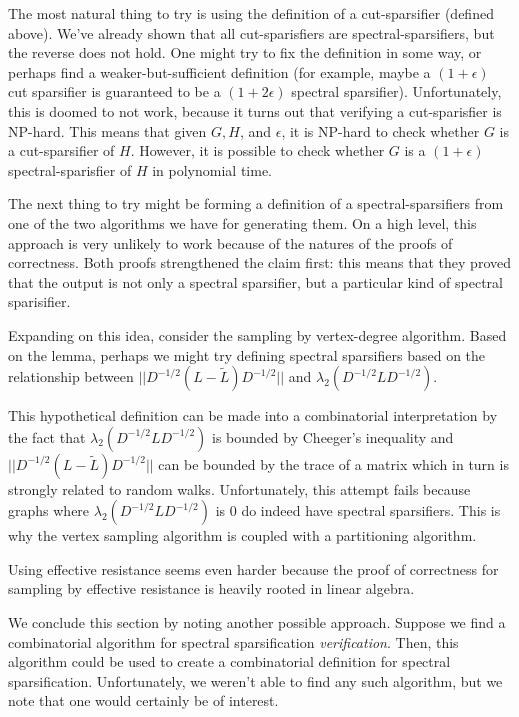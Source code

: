 \documentclass[12pt,twoside]{article}
\begin{document}
The most natural thing to try is using the definition of a cut-sparsifier (defined above). We've already shown that all cut-sparisfiers are spectral-sparsifiers, but the reverse does not hold. One might try to fix the definition in some way, or perhaps find a weaker-but-sufficient definition (for example, maybe a $(1 + \epsilon)$ cut sparsifier is guaranteed to be a $(1 + 2\epsilon)$ spectral sparsifier). Unfortunately, this is doomed to not work, because it turns out that verifying a cut-sparisfier is NP-hard. This means that given $G, H$, and $\epsilon$, it is NP-hard to check whether $G$ is a cut-sparsifier of $H$. However, it is possible to check whether $G$ is a $(1 + \epsilon)$ spectral-sparisfier of $H$ in polynomial time.

The next thing to try might be forming a definition of a spectral-sparsifiers from one of the two algorithms we have for generating them. On a high level, this approach is very unlikely to work because of the natures of the proofs of correctness. Both proofs strengthened the claim first: this means that they proved that the output is not only a spectral sparsifier, but a particular kind of spectral sparisifier.

Expanding on this idea, consider the sampling by vertex-degree algorithm. Based on the lemma, perhaps we might try defining spectral sparsifiers based on the relationship between $||D^{-1/2}(L - \tilde{L})D^{-1/2}||$ and $\lambda_2(D^{-1/2}LD^{-1/2})$. 

This hypothetical definition can be made into a combinatorial interpretation by the fact that $\lambda_2(D^{-1/2}LD^{-1/2})$ is bounded by Cheeger's inequality and $||D^{-1/2}(L - \tilde{L})D^{-1/2}||$ can be bounded by the trace of a matrix which in turn is strongly related to random walks. Unfortunately, this attempt fails because graphs where $\lambda_2(D^{-1/2}LD^{-1/2})$ is 0 do indeed have spectral sparsifiers. This is why the vertex sampling algorithm is coupled with a partitioning algorithm. 

Using effective resistance seems even harder because the proof of correctness for sampling by effective resistance is heavily rooted in linear algebra. 

We conclude this section by noting another possible approach. Suppose we find a combinatorial algorithm for spectral sparsification \emph{verification}. Then, this algorithm could be used to create a combinatorial definition for spectral sparsification. Unfortunately, we weren't able to find any such algorithm, but we note that one would certainly be of interest.
\end{document}
